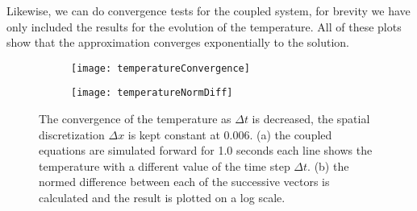 Likewise, we can do convergence tests for the coupled system, for brevity we have only included the results for the evolution of the temperature. All of these plots show that the approximation converges exponentially to the solution.

\begin{figure}[b]
	\begin{subfigure}{0.49\textwidth}
		\texttt{[image: temperatureConvergence]}
	\end{subfigure}
	\begin{subfigure}{0.49\textwidth}
		\texttt{[image: temperatureNormDiff]}
	\end{subfigure}
\caption{The convergence of the temperature as $\Delta t$ is decreased, the spatial discretization $\Delta x$ is kept constant at 0.006. (a) the coupled equations are simulated forward for 1.0 seconds each line shows the temperature with a different value of the time step $\Delta t$. (b) the normed difference between each of the successive vectors is calculated and the result is plotted on  a log scale.}
\label{fig:temperatureConvergence}
\end{figure}

